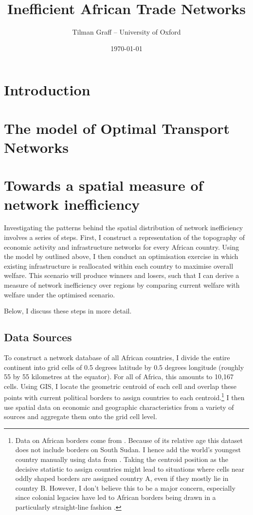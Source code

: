 \documentclass[11pt, oneside]{article}   	%
\title{Inefficient African Trade Networks}
\author{Tilman Graff -- University of Oxford}
\date{\today}
\begin{document}

\maketitle


\section{Introduction}

\section{The \cite{fajgelbaum_optimal_2017} model of Optimal Transport Networks}

\section{Towards a spatial measure of network inefficiency}

Investigating the patterns behind the spatial distribution of network inefficiency involves a series of steps. First, I construct a representation of the topography of economic activity and infrastructure networks for every African country. Using the model by \cite{fajgelbaum_optimal_2017} outlined above, I then conduct an optimisation exercise in which existing infrastructure is reallocated within each country to maximise overall welfare. This scenario will produce winners and losers, such that I can derive a measure of network inefficiency over regions by comparing current welfare with welfare under the optimised scenario.

Below, I discuss these steps in more detail.

\subsection{Data Sources}

To construct a network database of all African countries, I divide the entire continent into grid cells of 0.5 degrees latitude by 0.5 degrees longitude (roughly 55 by 55 kilometres at the equator). For all of Africa, this amounts to 10,167 cells. Using GIS, I locate the geometric centroid of each cell and overlap these points with current political borders to assign countries to each centroid.\footnote{Data on African borders come from \cite{Sandvik_WorldBordersDataset_2008}. Because of its relative age this dataset does not include borders on South Sudan. I hence add the world's youngest country manually using data from \cite{OCHA_SouthSudanAdministrative_2017}. Taking the centroid position as the decisive statistic to assign countries might lead to situations where cells near oddly shaped borders are assigned country A, even if they mostly lie in country B. However, I don't believe this to be a major concern, especially since colonial legacies have led to African borders being drawn in a particularly straight-line fashion \citep[see][]{Alesina_ArtificialStates_2011}.} I then use spatial data on economic and geographic characteristics from a variety of sources and aggregate them onto the grid cell level.
\end{document}
